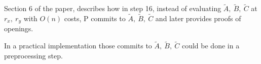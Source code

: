 \documentclass{article}
\theoremstyle{definition}
\begin{document}
Section 6 of the paper, describes how in step 16, instead of evaluating $\widetilde{A},~\widetilde{B},~\widetilde{C}$ at $r_x,~r_y$ with $O(n)$ costs, P commits to $\widetilde{A},~\widetilde{B},~\widetilde{C}$ and later provides proofs of openings.

In a practical implementation those commits to $\widetilde{A},~\widetilde{B},~\widetilde{C}$ could be done in a preprocessing step.

\vspace{1cm}





\end{document}
